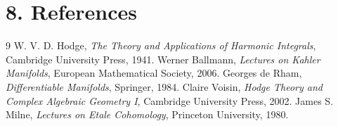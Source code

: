 \section*{8. References}

\begin{thebibliography}{9}
 W. V. D. Hodge, \emph{The Theory and Applications of Harmonic Integrals}, Cambridge University Press, 1941.
 Werner Ballmann, \emph{Lectures on Kahler Manifolds}, European Mathematical Society, 2006.
 Georges de Rham, \emph{Differentiable Manifolds}, Springer, 1984.
 Claire Voisin, \emph{Hodge Theory and Complex Algebraic Geometry I}, Cambridge University Press, 2002.
 James S. Milne, \emph{Lectures on Etale Cohomology}, Princeton University, 1980.
\end{thebibliography}
